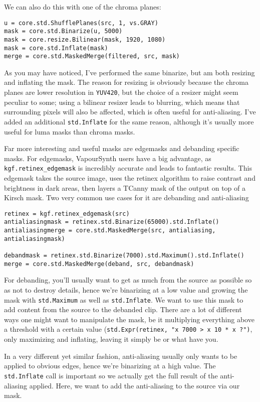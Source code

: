 \documentclass{scrartcl}
\begin{document}
We can also do this with one of the chroma planes:
\begin{lstlisting}
u = core.std.ShufflePlanes(src, 1, vs.GRAY)
mask = core.std.Binarize(u, 5000)
mask = core.resize.Bilinear(mask, 1920, 1080)
mask = core.std.Inflate(mask)
merge = core.std.MaskedMerge(filtered, src, mask)
\end{lstlisting}
As you may have noticed, I've performed the same binarize, but am both resizing and inflating the mask.  The reason for resizing is obviously because the chroma planes are lower resolution in \texttt{YUV420}, but the choice of a resizer might seem peculiar to some; using a bilinear resizer leads to blurring, which means that surrounding pixels will also be affected, which is often useful for anti-aliasing. I've added an additional \texttt{std.Inflate} for the same reason, although it's usually more useful for luma masks than chroma masks.

Far more interesting and useful masks are edgemasks and debanding specific masks. For edgemasks, VapourSynth users have a big advantage, as \texttt{kgf.retinex\_edgemask} is incredibly accurate and leads to fantastic results.  This edgemask takes the source image, uses the retinex algorithm to raise contrast and brightness in dark areas, then layers a TCanny mask of the output on top of a Kirsch mask. Two very common use cases for it are debanding and anti-aliasing
\begin{lstlisting}
retinex = kgf.retinex_edgemask(src)
antialiasingmask = retinex.std.Binarize(65000).std.Inflate()
antialiasingmerge = core.std.MaskedMerge(src, antialiasing, antialiasingmask)

debandmask = retinex.std.Binarize(7000).std.Maximum().std.Inflate()
merge = core.std.MaskedMerge(deband, src, debandmask)
\end{lstlisting}
For debanding, you'll usually want to get as much from the source as possible so as not to destroy details, hence we're binarizing at a low value and growing the mask with \texttt{std.Maximum} as well as \texttt{std.Inflate}. We want to use this mask to add content from the source to the debanded clip.  There are a lot of different ways one might want to manipulate the mask, be it multiplying everything above a threshold with a certain value (\texttt{std.Expr(retinex, "x 7000 > x 10 * x ?")}, only maximizing and inflating, leaving it simply be or what have you.

In a very different yet similar fashion, anti-aliasing usually only wants to be applied to obvious edges, hence we're binarizing at a high value.  The \texttt{std.Inflate} call is important so we actually get the full result of the anti-aliasing applied.  Here, we want to add the anti-aliasing to the source via our mask.
\end{document}
